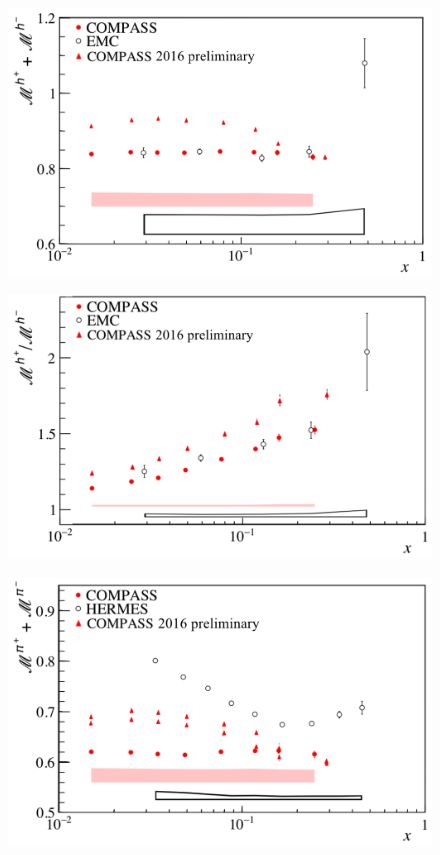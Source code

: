 \documentclass[letterpaper,12pt]{article}
\begin{document}
\newpage

\begin{figure}[H]
	\includegraphics[scale=0.38]{./gfx/hs.png}
	\caption{}
	\label{hs}
\end{figure}

\begin{figure}[H]
	\includegraphics[scale=0.38]{./gfx/hr.png}
	\caption{}
	\label{hr}
\end{figure}

\begin{figure}[H]
	\includegraphics[scale=0.38]{./gfx/Pis.png}
	\caption{}
	\label{Pis}
\end{figure}
\end{document}

